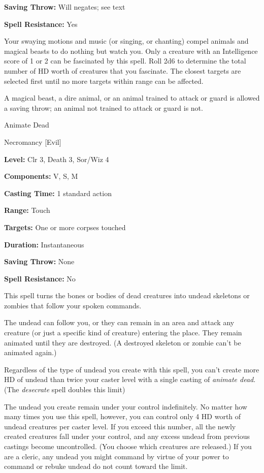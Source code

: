 \documentclass{article}
\begin{document}
\textbf{Saving Throw: }Will negates; see text

\textbf{Spell Resistance:} Yes

Your swaying motions and music (or singing, or chanting) compel animals and magical 
beasts to do nothing but watch you. Only a creature with an Intelligence score 
of 1 or 2 can be fascinated by this spell. Roll 2d6 to determine the total number 
of HD worth of creatures that you fascinate. The closest targets are selected first 
until no more targets within range can be affected.

A magical beast, a dire animal, or an animal trained to attack or guard is allowed 
a saving throw; an animal not trained to attack or guard is not.

\vspace{12pt}
Animate Dead

Necromancy [Evil]

\textbf{Level:} Clr 3, Death 3, Sor/Wiz 4

\textbf{Components:} V, S, M

\textbf{Casting Time:} 1 standard action

\textbf{Range:} Touch

\textbf{Targets:} One or more corpses touched

\textbf{Duration:} Instantaneous

\textbf{Saving Throw:} None

\textbf{Spell Resistance:} No

This spell turns the bones or bodies of dead creatures into undead skeletons or 
zombies that follow your spoken commands.

The undead can follow you, or they can remain in an area and attack any creature 
(or just a specific kind of creature) entering the place. They remain animated 
until they are destroyed. (A destroyed skeleton or zombie can't be animated again.)

Regardless of the type of undead you create with this spell, you can't create more 
HD of undead than twice your caster level with a single casting of \textit{animate 
dead}. (The \textit{desecrate }spell doubles this limit)

The undead you create remain under your control indefinitely. No matter how many 
times you use this spell, however, you can control only 4 HD worth of undead creatures 
per caster level. If you exceed this number, all the newly created creatures fall 
under your control, and any excess undead from previous castings become uncontrolled. 
(You choose which creatures are released.) If you are a cleric, any undead you 
might command by virtue of your power to command or rebuke undead do not count 
toward the limit.
\end{document}
